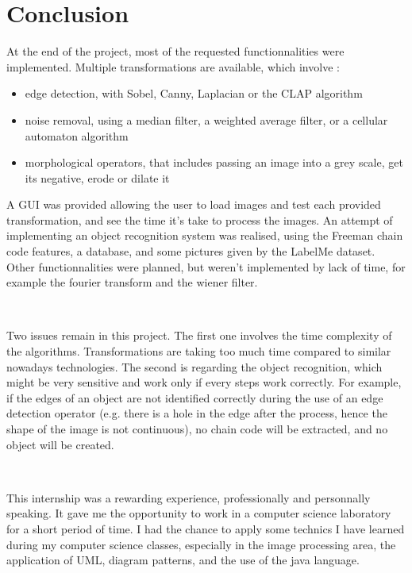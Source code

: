 \chapter{Conclusion}

At the end of the project, most of the requested functionnalities were implemented. Multiple transformations are available, which involve : 
\begin{itemize}
	\item edge detection, with Sobel, Canny, Laplacian or the \gls{CLAP} \gls{algorithm}
	\item noise removal, using a median filter, a weighted average filter, or a cellular automaton \gls{algorithm}
	\item morphological operators, that includes passing an image into a grey scale, get its negative, erode or dilate it 
\end{itemize}


A \acrlong{GUI} was provided allowing the user to load images and test each provided transformation, and see the time it's take to process the images. An attempt of implementing an object recognition system was realised, using the Freeman chain code features, a database, and some pictures given by the LabelMe dataset. Other functionnalities were planned, but weren't implemented by lack of time, for example the fourier transform and the wiener filter. 

~~

Two issues remain in this project. The first one involves the time complexity of the algorithms. Transformations are taking too much time compared to similar nowadays technologies. The second is regarding the object recognition, which might be very sensitive and work only if every steps work correctly. For example, if the edges of an object are not identified correctly during the use of an edge detection operator (e.g. there is a hole in the edge after the process, hence the shape of the image is not continuous), no chain code will be extracted, and no object will be created.

~~

This internship was a rewarding experience, professionally and personnally speaking. It gave me the opportunity to work in a computer science laboratory for a short period of time. I had the chance to apply some technics I have learned during my computer science classes, especially in the image processing area, the application of UML, diagram patterns, and the use of the java language. 
